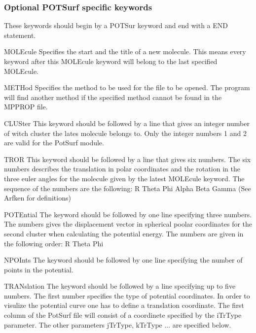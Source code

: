 \subsubsection{Optional POTSurf specific keywords}
These keywords should begin by a POTSur keyword and end with a END statement.
\begin{keywordlist}
\item[MOLEcule]
Specifies the start and the title of a new molecule. This means every keyword after this MOLEcule keyword will belong to the last specified MOLEcule.
\item[METHod]
Specifies the method to be used for the file to be opened. The program will find another method if the specified method cannot be found in the MPPROP file.
\item[CLUSter]
This keyword should be followed by a line that gives an integer number of witch cluster the lates molecule belongs to. Only the integer numbers 1 and 2 are valid for the PotSurf module.
\item[TROR]
This keyword should be followed by a line that gives six numbers. The six numbers describes the translation in polar coordinates and the rotation in the three euler angles for the molecule given by the latest MOLEcule keyword. The sequence of the numbers are the following: R Theta Phi Alpha Beta Gamma (See Arfken for definitions)
\item[POTEntial]
The keyword should be followed by one line specifying three numbers. The numbers gives the displacement vector in spherical poolar coordinates for the second cluster when calculating the potential energy. The numbers are given in the following order: R Theta Phi
\item[NPOInts]
The keyword should be followed by one line specifying the number of points in the potential.
\item[TRANslation]
The keyword should be followed by a line specifying up to five numbers. The first number specifies the type of potential coordinates.
In order to visulize the potential curve one has to define a translation coordinate.
The first column of the PotSurf file will consist of a coordinete specified by the iTrType parameter. The other parameters jTrType, kTrType ... are specified below.

\end{keywordlist}

